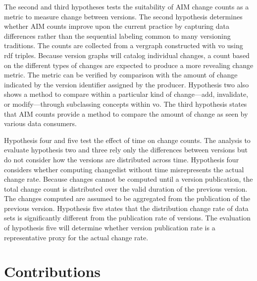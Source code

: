 The second and third hypotheses tests the suitability of \gls{AIM} change counts as a metric to measure \gls{change} between \glspl{version}.
The second hypothesis determines whether \gls{AIM} counts improve upon the current practice by capturing data differences rather than the sequential labeling common to many versioning traditions.
The counts are collected from a \gls{vergraph} constructed with \gls{vo} using \gls{rdf} triples.
Because version graphs will catalog individual changes, a count based on the different types of changes are expected to produce a more revealing change metric.
The metric can be verified by comparison with the amount of change indicated by the version identifier assigned by the producer.
Hypothesis two also shows a method to compare within a particular kind of change---\gls{add}, \gls{invalidate}, or \gls{modify}---through subclassing concepts within \gls{vo}.
The third hypothesis states that \gls{AIM} counts provide a method to compare the amount of change as seen by various data consumers.

Hypothesis four and five test the effect of time on change counts.
The analysis to evaluate hypothesis two and three rely only the differences between \glspl{version} but do not consider how the \glspl{version} are distributed across time.
Hypothesis four considers whether computing \gls{changedist} without time misrepresents the actual change rate.
Because \glspl{change} cannot be computed until a version publication, the total change count is distributed over the valid duration of the previous \gls{version}.
The \glspl{change} computed are assumed to be aggregated from the publication of the previous \gls{version}.
Hypothesis five states that the distribution change rate of data sets is significantly different from the publication rate of versions.
The evaluation of hypothesis five will determine whether version publication rate is a representative proxy for the actual change rate.

\section{Contributions}


